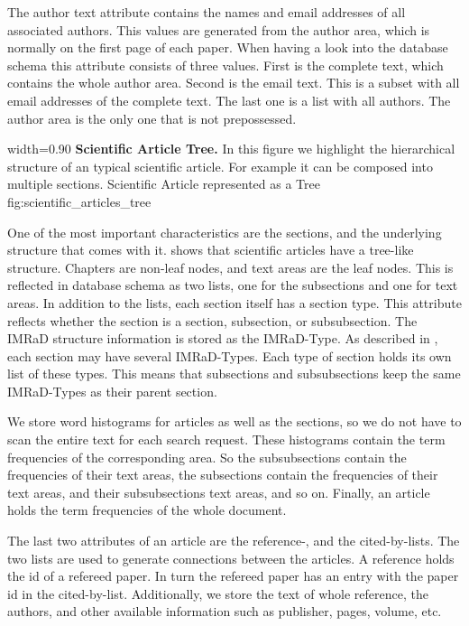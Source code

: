 The author text attribute contains the names and email addresses of all associated authors. This values are generated from the author area, which is normally on the first page of each paper. When having a look into the database schema this attribute consists of three values. First is the complete text, which contains the whole author area. Second is the email text. This is a subset with all email addresses of the complete text. The last one is a list with all authors. The author area is the only one that is not prepossessed.

      {width=0.90\textwidth}
      {\textbf{Scientific Article Tree.} In this figure we highlight the hierarchical structure of an typical scientific article. For example it can be composed into multiple sections.}
      {Scientific Article represented as a Tree}
      {fig:scientific_articles_tree}

One of the most important characteristics are the sections, and the underlying structure that comes with it.  shows that scientific articles have a tree-like structure. Chapters are non-leaf nodes, and text areas are the leaf nodes. This is reflected in database schema as two lists, one for the subsections and one for text areas. In addition to the lists, each section itself has a section type. This attribute reflects whether the section is a section, subsection, or subsubsection. The IMRaD structure information is stored as the IMRaD-Type. As described in , each section may have several IMRaD-Types. Each type of section holds its own list of these types. This means that subsections and subsubsections keep the same IMRaD-Types as their parent section.

We store word histograms for articles as well as the sections, so we do not have to scan the entire text for each search request. These histograms contain the term frequencies of the corresponding area. So the subsubsections contain the frequencies of their text areas, the subsections contain the frequencies of their text areas, and their subsubsections text areas, and so on. Finally, an article holds the term frequencies of the whole document.

The last two attributes of an article are the reference-, and the cited-by-lists. The two lists are used to generate connections between the articles. A reference holds the id of a refereed paper. In turn the refereed paper has an entry with the paper id in the cited-by-list. Additionally, we store the text of whole reference, the authors, and other available information such as publisher, pages, volume, etc.

